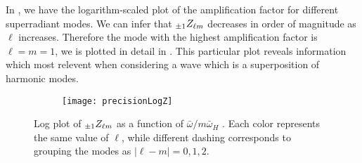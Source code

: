 In , we have the logarithm-scaled plot of the amplification factor for different superradiant modes. We can infer that $\uu[\pm 1]{Z}{\ell m}$ decreases in order of magnitude as $\ell$ increases.
Therefore the mode with the highest amplification factor is $\ell=m=1$, we is plotted in detail in .
This particular plot reveals information which most relevent when considering a wave which is a superposition of harmonic modes.
\begin{figure}[t]
	\centering
	\begin{subfigure}[c]{0.9\textwidth}
        \texttt{[image: precisionLogZ]}
	\end{subfigure}
	\caption{Log plot of $\uu[\pm 1]{Z}{\ell m}$ as a function of $\bar{\omega}/m\bar{\omega}_H$ \cite{TeukolskyPress1973b}. Each color represents the same value of $\ell$, while different dashing corresponds to grouping the modes as $|\ell-m|=0,1,2$.}
	\label{fig4:logZ}
\end{figure}


\cleardoublepage